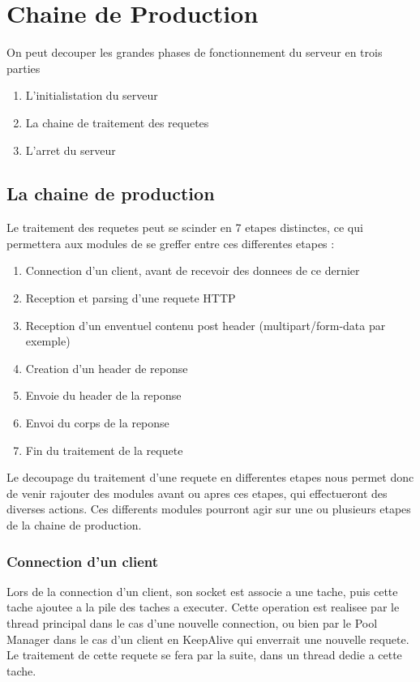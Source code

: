 \chapter{Chaine de Production}
On peut decouper les grandes phases de fonctionnement du serveur en trois parties

\begin{enumerate}
    \item L'initialistation du serveur
    \item La chaine de traitement des requetes
    \item L'arret du serveur
\end{enumerate}

\section{La chaine de production}
Le traitement des requetes peut se scinder en 7 etapes distinctes, 
ce qui permettera aux modules de se greffer entre ces differentes etapes :
\begin{enumerate}
    \item Connection d'un client, avant de recevoir des donnees de ce dernier
    \item Reception et parsing d'une requete HTTP
    \item Reception d'un enventuel contenu post header (multipart/form-data par exemple)
    \item Creation d'un header de reponse
    \item Envoie du header de la reponse
    \item Envoi du corps de la reponse
    \item Fin du traitement de la requete
\end{enumerate}

Le decoupage du traitement d'une requete en differentes etapes nous permet
donc de venir rajouter des modules avant ou apres ces etapes, qui 
effectueront des diverses actions. Ces differents modules pourront agir 
sur une ou plusieurs etapes de la chaine de production.

\subsection{Connection d'un client}
Lors de la connection d'un client, son socket est associe a une tache, puis cette tache ajoutee a la pile des taches a executer.
Cette operation est realisee par le thread principal dans le cas d'une nouvelle connection, ou bien par le Pool Manager dans le cas d'un client en KeepAlive qui enverrait une nouvelle requete.
Le traitement de cette requete se fera par la suite, dans un thread dedie a cette tache.

